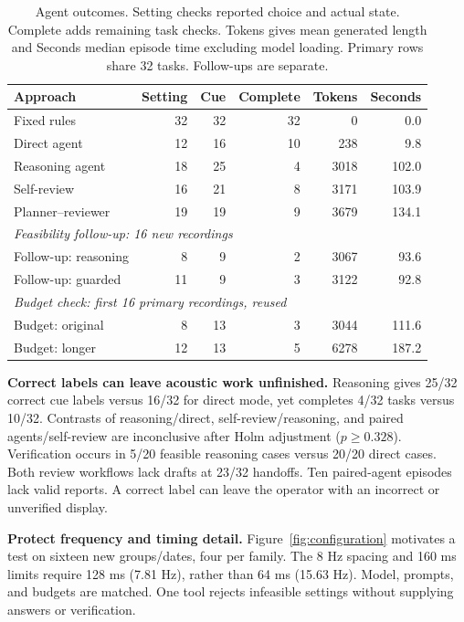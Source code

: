 \documentclass[runningheads,orivec]{llncs}
\begin{document}
\begin{table}[htbp]
\caption{Agent outcomes. Setting checks reported choice and actual state. Complete adds remaining task checks. Tokens gives mean generated length and Seconds median episode time excluding model loading. Primary rows share 32 tasks. Follow-ups are separate.}
\label{tab:3}
\centering\small
\begin{tabular*}{\linewidth}{@{\extracolsep{\fill}}lrrrrr@{}}
\toprule
\textbf{Approach} & \textbf{Setting} & \textbf{Cue} & \textbf{Complete} & \textbf{Tokens} & \textbf{Seconds} \\
\midrule
Fixed rules & 32 & 32 & 32 & 0 & 0.0 \\
Direct agent & 12 & 16 & 10 & 238 & 9.8 \\
Reasoning agent & 18 & 25 & 4 & 3018 & 102.0 \\
Self-review & 16 & 21 & 8 & 3171 & 103.9 \\
Planner--reviewer & 19 & 19 & 9 & 3679 & 134.1 \\
\midrule
\multicolumn{6}{l}{\emph{Feasibility follow-up: 16 new recordings}} \\
Follow-up: reasoning & 8 & 9 & 2 & 3067 & 93.6 \\
Follow-up: guarded & 11 & 9 & 3 & 3122 & 92.8 \\
\midrule
\multicolumn{6}{l}{\emph{Budget check: first 16 primary recordings, reused}} \\
Budget: original & 8 & 13 & 3 & 3044 & 111.6 \\
Budget: longer & 12 & 13 & 5 & 6278 & 187.2 \\
\bottomrule
\end{tabular*}
\end{table}

\textbf{Correct labels can leave acoustic work unfinished.} Reasoning gives 25/32 correct cue labels versus 16/32 for direct mode, yet completes 4/32 tasks versus 10/32. Contrasts of reasoning/direct, self-review/reasoning, and paired agents/self-review are inconclusive after Holm adjustment ($p\geq0.328$). Verification occurs in 5/20 feasible reasoning cases versus 20/20 direct cases. Both review workflows lack drafts at 23/32 handoffs. Ten paired-agent episodes lack valid reports. A correct label can leave the operator with an incorrect or unverified display.

\textbf{Protect frequency and timing detail.} Figure~\ref{fig:configuration} motivates a test on sixteen new groups/dates, four per family. The 8 Hz spacing and 160 ms limits require 128 ms (7.81 Hz), rather than 64 ms (15.63 Hz). Model, prompts, and budgets are matched. One tool rejects infeasible settings without supplying answers or verification.
\end{document}
